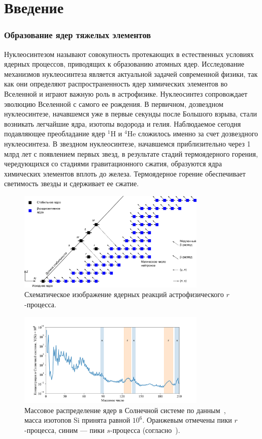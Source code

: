 \section*{Введение}
\subsubsection*{Образование ядер тяжелых элементов}
Нуклеосинтезом называют совокупность протекающих в естественных условиях ядерных процессов, приводящих к образованию атомных ядер. Исследование механизмов нуклеосинтеза является актуальной задачей современной физики, так как они определяют распространенность ядер химических элементов во Вселенной и играют важную роль в астрофизике. Нуклеосинтез сопровождает эволюцию Вселенной с самого ее рождения. В первичном, дозвездном нуклеосинтезе, начавшемся уже в первые секунды после Большого взрыва, стали возникать легчайшие ядра, изотопы водорода и гелия. Наблюдаемое сегодня подавляющее преобладание ядер ${}^1$H и ${}^4$He сложилось именно за счет дозвездного нуклеосинтеза. В звездном нуклеосинтезе, начавшемся приблизительно через 1 млрд лет с появлением первых звезд, в результате стадий термоядерного горения, чередующихся со стадиями гравитационного сжатия, образуются ядра химических элементов вплоть до железа. Термоядерное горение обеспечивает светимость звезды и сдерживает ее сжатие.

\begin{figure}[!b]
  \centering
  \includegraphics[width=0.8\textwidth]{pics/tracks.pdf}
  \caption{Схематическое изображение ядерных реакций астрофизического $r$-процесса.}
  \label{fig:tracks}
\end{figure}

\begin{figure}[!b]
  \centering
  \includegraphics[width=0.8\textwidth]{pics/lodders.pdf}
  \caption{Массовое распределение ядер в Солнечной системе по данным~\cite{lodders2003}, масса изотопов Si принята равной $10^6$. Оранжевым отмечены пики $r$-процесса, синим --- пики $s$-процесса (согласно~\cite{cowan2021}).}
  \label{fig:lodders_vs_ame}
\end{figure}

